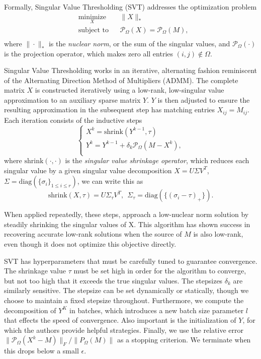 \documentclass{article} %
\begin{document}
Formally, Singular Value Thresholding (SVT) addresses the optimization
problem
\begin{equation*}
\begin{aligned}
  & \underset{X}{\text{minimize}} & & \|X\|_{*} \\
  & \text{subject to}             & & \mathcal{P}_\Omega (X) =
  \mathcal{P}_\Omega (M), \\
\end{aligned}
\end{equation*}
where $\|\cdot\|_{*}$ is the \emph{nuclear norm}, or the sum of the
singular values, and $\mathcal{P}_\Omega (\cdot)$ is the projection
operator, which makes zero all entries $(i, j) \notin \Omega$.

Singular Value Thresholding works in an iterative, alternating fashion
reminiscent of the Alternating Direction Method of Multipliers (ADMM).
The complete matrix $X$ is constructed iteratively using a low-rank,
low-singular value approximation to an auxiliary sparse matrix $Y$.
$Y$ is then adjusted to ensure the resulting approximation in the
subsequent step has matching entries $X_{ij} = M_{ij}$. Each iteration
consists of the inductive steps
\begin{equation*}
\begin{cases}
X^{k} = \mathrm{shrink}(Y^{k-1}, \tau) \\
Y^{k} = Y^{k-1} + \delta_k \mathcal{P}_\Omega (M-X^{k}),              \\
\end{cases}
\end{equation*}
where $\mathrm{shrink}(\cdot, \cdot)$ is the \emph{singular value
  shrinkage operator}, which reduces each singular value by a given
singular value decomposition $X = U \Sigma V^T$,
$\Sigma = \mathrm{diag}(\{\sigma_i\}_{1 \le i \le r})$, we can write
this as
\begin{equation*}
\mathrm{shrink}(X, \tau) = U\Sigma_\tau V^T, \ \ \Sigma_\tau = \mathrm{diag}(\{(\sigma_i-\tau)_{+}\}).
\end{equation*}


When applied repeatedly, these steps, approach a low-nuclear norm
solution by steadily shrinking the singular values of X. This
algorithm has shown success in recovering accurate low-rank solutions
when the source of $M$ is also low-rank, even though it does not
optimize this objective directly.

SVT has hyperparameters that must be carefully tuned to guarantee
convergence. The shrinkage value $\tau$ must be set high in order for
the algorithm to converge, but not too high that it exceeds the true
singular values. The stepsizes $\delta_k$ are similarly sensitive. The
stepsize can be set dynamically or statically, though we choose to
maintain a fixed stepsize throughout. Furthermore, we compute the
decomposition of $Y^K$ in batches, which introduces a new batch size
parameter $l$ that effects the speed of convergence. Also important is
the initialization of $Y$, for which the authors provide helpful
strategies. Finally, we use the relative error
$\|\mathcal{P}_{\Omega}(X^k-M)\|_F / \|P_{\Omega} (M)\|$ as a stopping
criterion. We terminate when this drops below a small $\epsilon$.
\end{document}
